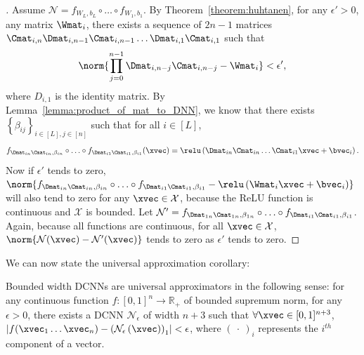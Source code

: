 \begin{proof}[]
Assume $\mathcal{N}=f_{W_{L},b_{L}} \circ \ldots \circ f_{W_{1},b_{1}}$.
By Theorem~\ref{theorem:huhtanen}, for any $\epsilon '> 0$, any matrix $\Wmat_{i}$, there exists a sequence of $2n-1$ matrices $\Cmat_{i,n} \Dmat_{i,n-1} \Cmat_{i,n-1} \ldots \Dmat_{i,1} \Cmat_{i,1}$ such that 
\begin{equation}
  \norm{\prod_{j=0}^{n-1} \Dmat_{i,n-j} \Cmat_{i,n-j} - \Wmat_{i}} < \epsilon' , 
\end{equation}
where $D_{i,1}$ is the identity matrix.
By Lemma~\ref{lemma:product_of_mat_to_DNN}, we know that there exists $\left\{ \beta_{ij} \right\}_{i \in[L], j \in [n]}$ such that for all $i\in[L]$, 
\begin{equation}
  f_{\Dmat_{in} \Cmat_{in},\beta_{in}} \circ \ldots \circ f_{\Dmat_{i1} \Cmat_{i1}, \beta_{i1}}(\xvec) = \relu \left(\Dmat_{in}\Cmat_{in} \ldots \Cmat_{i1} \xvec + \bvec_{i} \right).
\end{equation}
Now if $\epsilon'$ tends to zero, $\norm{ f_{\Dmat_{in} \Cmat_{in},\beta_{in}} \circ \ldots \circ f_{\Dmat_{i1}\Cmat_{i1},\beta_{i1}} - \relu \left(\Wmat_{i}\xvec+\bvec_{i}\right)}$ will also tend to zero for any $\xvec \in \mathcal{X}$, because the ReLU function is continuous and $\mathcal{X}$ is bounded.
Let $\mathcal{N}' = f_{\Dmat_{1n} \Cmat_{1n},\beta_{1n}} \circ \ldots \circ f_{\Dmat_{i1}\Cmat_{i1},\beta_{i1}}$.
Again, because all functions are continuous, for all $\xvec \in \mathcal{X}$, $\norm{ \mathcal{N}(\xvec)-\mathcal{N}'(\xvec)} $ tends to zero as $\epsilon'$ tends to zero.
\end{proof}




We can now state the universal approximation corollary:

\begin{corollary} \label{corollary:universal}
Bounded width DCNNs are universal approximators in the following sense: for any continuous function $f:[0,1]^{n}\rightarrow\mathbb{R}_+$ of bounded supremum norm, for any $\epsilon > 0$, there exists a DCNN $\mathcal{N}_{\epsilon}$ of width $n+3$ such that $\forall \xvec \in [0,1]^{n+3}$, $\left| f(\xvec_{1} \ldots \xvec_{n}) - \left( \mathcal{N}_{\epsilon} \left( \xvec \right) \right)_{1} \right| < \epsilon$, where $\left(\ \cdot\ \right)_{i}$ represents the $i^{th}$ component of a vector.
\end{corollary}


